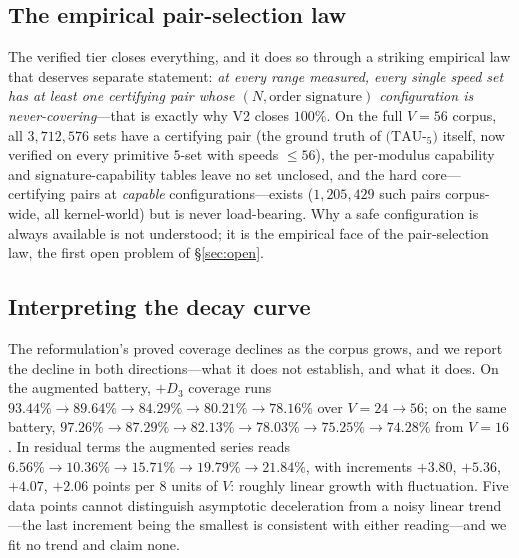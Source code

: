 \documentclass[11pt,a4paper]{article}
\numberwithin{equation}{section}
\theoremstyle{plain}
\theoremstyle{definition}
\theoremstyle{remark}
\begin{document}
\subsection{The empirical pair-selection law}

The verified tier closes everything, and it does so through a striking
empirical law that deserves separate statement: \emph{at every range
measured, every single speed set has at least one certifying pair whose
$(N,\text{order signature})$ configuration is never-covering}---that is
exactly why V2 closes $100\%$. On the full $V=56$ corpus, all
$3{,}712{,}576$ sets have a certifying pair (the ground truth of
$(\mathrm{TAU}$-$_5)$ itself, now verified on every primitive $5$-set
with speeds $\le56$), the per-modulus capability and
signature-capability tables leave no set unclosed, and the hard
core---certifying pairs at \emph{capable} configurations---exists
($1{,}205{,}429$ such pairs corpus-wide, all kernel-world) but is never
load-bearing. Why a safe configuration is always available is not
understood; it is the empirical face of the pair-selection law, the
first open problem of \S\ref{sec:open}.

\subsection{Interpreting the decay curve}

The reformulation's proved coverage declines as the corpus grows, and we
report the decline in both directions---what it does not
establish, and what it does. On the augmented battery, $+D_3$ coverage
runs $93.44\%\to89.64\%\to84.29\%\to80.21\%\to78.16\%$ over
$V=24\to56$; on the same battery,
$97.26\%\to87.29\%\to82.13\%\to78.03\%\to75.25\%\to74.28\%$ from
$V=16$. In residual terms the augmented series reads
$6.56\%\to10.36\%\to15.71\%\to19.79\%\to21.84\%$, with increments
$+3.80$, $+5.36$, $+4.07$, $+2.06$ points per $8$ units of $V$: roughly
linear growth with fluctuation. Five data points cannot distinguish
asymptotic deceleration from a noisy linear trend---the last increment
being the smallest is consistent with either reading---and we fit no
trend and claim none.
\end{document}
